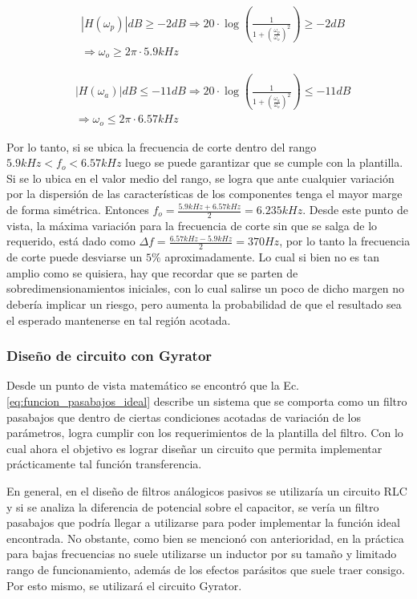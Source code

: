 \begin{eqnarray*}
    & |H(\omega_p)|dB \geq -2dB \Rightarrow 20 \cdot \log{\left(\frac{1}{1 + \left(\frac{\omega_p}{\omega_o}\right)^{2}}\right)} \geq -2dB\\
    & \Rightarrow \omega_o \geq 2\pi \cdot 5.9kHz
\end{eqnarray*}

\begin{eqnarray*}
    & |H(\omega_a)|dB \leq -11dB \Rightarrow 20 \cdot \log{\left(\frac{1}{1 + \left(\frac{\omega_a}{\omega_o}\right)^{2}}\right)} \leq -11dB \\
    & \Rightarrow \omega_o \leq 2 \pi \cdot 6.57kHz
\end{eqnarray*}

Por lo tanto, si se ubica la frecuencia de corte dentro del rango $5.9kHz < f_o < 6.57kHz$ luego se puede garantizar que se cumple con la plantilla. Si se lo ubica en el valor medio del rango,
se logra que ante cualquier variaci\'on por la dispersi\'on de las caracter\'isticas de los componentes tenga el mayor marge de forma sim\'etrica. 
Entonces $f_o = \frac{5.9kHz + 6.57kHz}{2} = 6.235kHz$. Desde este punto de vista, la m\'axima variaci\'on para la frecuencia de corte sin que se salga de lo requerido,
est\'a dado como $\Delta f = \frac{6.57kHz - 5.9kHz}{2} = 370Hz$, por lo tanto la frecuencia de corte puede desviarse un $5\%$ aproximadamente. Lo cual si bien no es tan amplio como se quisiera, hay que recordar
que se parten de sobredimensionamientos iniciales, con lo cual salirse un poco de dicho margen no deber\'ia implicar un riesgo, pero aumenta la probabilidad de que el resultado sea el esperado mantenerse en tal regi\'on acotada.

\subsubsection{Dise\~no de circuito con Gyrator}
Desde un punto de vista matem\'atico se encontr\'o que la Ec. \ref{eq:funcion_pasabajos_ideal} describe un sistema que se comporta como un filtro pasabajos que dentro de ciertas condiciones
acotadas de variaci\'on de los par\'ametros, logra cumplir con los requerimientos de la plantilla del filtro. Con lo cual ahora el objetivo es lograr dise\~nar un circuito que permita implementar
pr\'acticamente tal funci\'on transferencia.

En general, en el dise\~no de filtros an\'alogicos pasivos se utilizar\'ia un circuito RLC y si se analiza la diferencia de potencial sobre el capacitor, se ver\'ia un filtro pasabajos que podr\'ia llegar a utilizarse
para poder implementar la funci\'on ideal encontrada. No obstante, como bien se mencion\'o con anterioridad, en la pr\'actica para bajas frecuencias no suele utilizarse un inductor por su tama\~no y limitado rango de funcionamiento,
adem\'as de los efectos par\'asitos que suele traer consigo. Por esto mismo, se utilizar\'a el circuito Gyrator.


